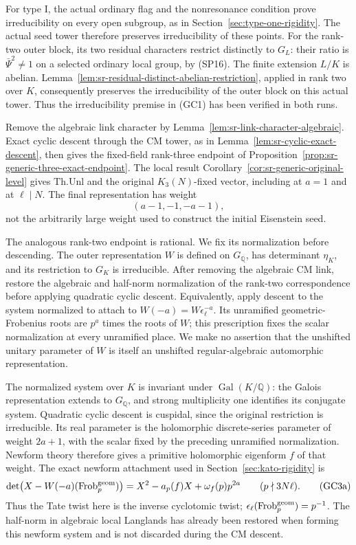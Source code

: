 For type I, the actual ordinary flag and the
nonresonance condition prove irreducibility on
every open subgroup, as in
Section~\ref{sec:type-one-rigidity}.
The actual seed tower therefore preserves
irreducibility of these points.
For the rank-two outer block, its two residual
characters restrict distinctly to \(G_L\):
their ratio is \(\bar\Psi^2\ne1\) on a selected
ordinary local group, by (SP16).
The finite extension \(L/K\) is abelian.
Lemma~\ref{lem:sr-residual-distinct-abelian-restriction},
applied in rank two over \(K\), consequently
preserves the irreducibility of the outer block
on this actual tower.
Thus the irreducibility premise in (GC1)
has been verified in both runs.

Remove the algebraic link character by
Lemma~\ref{lem:sr-link-character-algebraic}.
Exact cyclic descent through the CM tower,
as in Lemma~\ref{lem:sr-cyclic-exact-descent},
then gives the fixed-field rank-three endpoint
of Proposition~\ref{prop:sr-generic-three-exact-endpoint}.
The local result
Corollary~\ref{cor:sr-generic-original-level}
gives \(\mathrm{Th.Unl}\) and the original
\(K_3(N)\)-fixed vector, including at \(a=1\)
and at \(\ell\mid N\).
The final representation has weight
\[
                         (a-1,-1,-a-1),                    \tag{GC3}
\]
not the arbitrarily large weight used to construct
the initial Eisenstein seed.

The analogous rank-two endpoint is rational.
We fix its normalization before descending.
The outer representation \(W\) is defined on
\(G_{\mathbb Q}\), has determinant \(\eta_K\),
and its restriction to \(G_K\) is irreducible.
After removing the algebraic CM link, restore
the algebraic and half-norm normalization of
the rank-two correspondence before applying
quadratic cyclic descent.
Equivalently, apply descent to the system
normalized to attach to \(W(-a)=W\epsilon_\ell^{-a}\).
Its unramified geometric-Frobenius roots are
\(p^a\) times the roots of \(W\);
this prescription fixes the scalar normalization
at every unramified place.
We make no assertion that the unshifted
unitary parameter of \(W\) is itself an
unshifted regular-algebraic automorphic representation.

The normalized system over \(K\) is invariant
under \(\operatorname{Gal}(K/\mathbb Q)\):
the Galois representation extends to
\(G_{\mathbb Q}\), and strong multiplicity
one identifies its conjugate system.
Quadratic cyclic descent is cuspidal, since
the original restriction is irreducible.
Its real parameter is the holomorphic
discrete-series parameter of weight \(2a+1\),
with the scalar fixed by the preceding
unramified normalization.
Newform theory therefore gives a primitive
holomorphic eigenform \(f\) of that weight.
The exact newform attachment used in
Section~\ref{sec:kato-rigidity} is
\[
 \det\!\left(X-W(-a)(\operatorname{Frob}^{\rm geom}_p)\right)
       =X^2-a_p(f)X+\omega_f(p)p^{2a}
       \qquad(p\nmid 3N\ell).
 \tag{GC3a}
\]
Thus the Tate twist here is the inverse
cyclotomic twist; \(\epsilon_\ell
(\operatorname{Frob}^{\rm geom}_p)=p^{-1}\).
The half-norm in algebraic local Langlands
has already been restored when forming this
newform system and is not discarded during
the CM descent.

